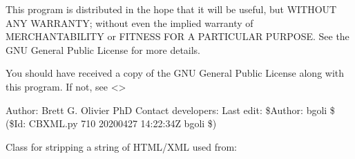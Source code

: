\documentclass[letterpaper,10pt,english]{sphinxmanual}
\begin{document}
\sphinxAtStartPar
This program is distributed in the hope that it will be useful,
but WITHOUT ANY WARRANTY; without even the implied warranty of
MERCHANTABILITY or FITNESS FOR A PARTICULAR PURPOSE.  See the
GNU General Public License for more details.

\sphinxAtStartPar
You should have received a copy of the GNU General Public License
along with this program.  If not, see \textless{}\textgreater{}

\sphinxAtStartPar
Author: Brett G. Olivier PhD
Contact developers: 
Last edit: \$Author: bgoli \$ (\$Id: CBXML.py 710 2020\sphinxhyphen{}04\sphinxhyphen{}27 14:22:34Z bgoli \$)

\begin{fulllineitems}
\label{\detokenize{modules_doc:cbmpy.CBXML.MLStripper}}
\pysigstartsignatures
{}
\pysigstopsignatures
\sphinxAtStartPar
Class for stripping a string of HTML/XML used from:

\end{fulllineitems}

\end{document}
